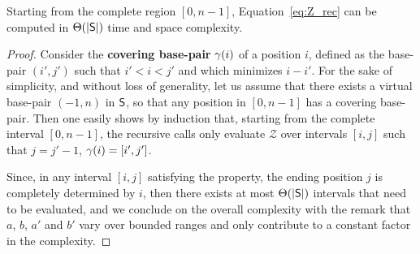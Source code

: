 \begin{theorem}Starting from the complete region $[0,n-1]$, Equation~\eqref{eq:Z_rec} can be computed in $\Theta(|\text{\sf S}|)$ time and space complexity.
\end{theorem}
\begin{proof}

Consider the {\bf covering base-pair} $\gamma(i)$ of a position $i$, defined as the base-pair $(i',j')$ such that $i'<i<j'$ and which minimizes $i-i'$. For the sake of simplicity, and without loss of generality, let us assume that there exists a virtual base-pair $(-1,n)$ in $\text{\sf S}$, so that any position in $[0,n-1]$ has a covering base-pair.
Then one easily shows by induction that, starting from the complete interval $[0,n-1]$, the recursive calls only evaluate $\mathcal{Z}$ over intervals $[i,j]$ such that $j=j'-1$, $\gamma(i)=[i',j']$. 

Since, in any interval $[i,j]$ satisfying the property, the ending position $j$ is completely determined by $i$, then there exists at most $\Theta(|\text{\sf S}|)$ intervals that need to be evaluated, and we conclude on the overall complexity with the remark that $a$, $b$, $a'$ and $b'$ vary over bounded ranges and only contribute to a constant factor in the complexity.
\end{proof}


